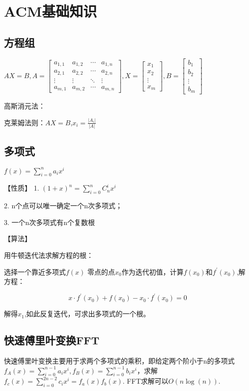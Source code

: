 \chapter{ACM基础知识}
\section{方程组}

$AX=B, A=\begin{bmatrix}
	a_{1,1} & a_{1,2} & \cdots & a_{1,n} \\
	a_{2,1} & a_{2,2} & \cdots & a_{2,n} \\
	\vdots  & \vdots  & \ddots & \vdots  \\
	a_{m,1} & a_{m,2} & \cdots & a_{m,n}
\end{bmatrix}, 
X=\begin{bmatrix}
x_{1}  \\
x_{2} \\
\vdots   \\
x_{m}
\end{bmatrix}, 
B=\begin{bmatrix}
b_{1}  \\
b_{2} \\
\vdots   \\
b_{m}
\end{bmatrix}$

高斯消元法：

克莱姆法则：$AX=B$,$x_i=\frac{|A_i|}{|A|}$

\section{多项式}
$f(x)=\sum_{i=0}^n{a_ix^i}$

【性质】
1. $(1+x)^n=\sum_{i=0}^n{C_n^ix^i}$

2. n个点可以唯一确定一个n次多项式；

3. 一个n次多项式有n个复数根

【算法】

用牛顿迭代法求解方程的根：

选择一个靠近多项式$f(x)$ 零点的点$x_0$作为迭代初值，计算$f(x_0)$和$f^{'}(x_0)$,解方程：

$$x\cdot f^{'}(x_0)+f(x_0)-x_0\cdot f^{'}(x_0)=0$$

解得$x_1$,如此反复迭代，可求出多项式的一个根。

\section{快速傅里叶变换FFT}
快速傅里叶变换主要用于求两个多项式的乘积，即给定两个阶小于n的多项式$f_{A}(x)=\sum_{i=0}^{n-1}{a_ix^i},f_{B}(x)=\sum_{i=0}^{n-1}{b_ix^i}$，求解$f_{c}(x)=\sum_{i=0}^{2n-2}{c_ix^i}=f_{a}(x)f_{b}(x)$. FFT求解可以$O(n\log(n))$.

